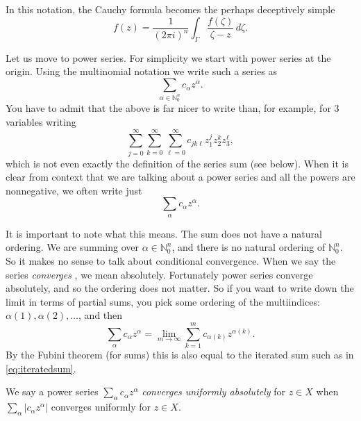 \documentclass[12pt,openany]{book}
\newcommand{\sabs}[1]{\lvert {#1} \rvert}
\newcommand{\N}{{\mathbb{N}}}
\newcommand{\myindex}[1]{#1\index{#1}}
\theoremstyle{plain}
\theoremstyle{remark}
\theoremstyle{definition}
\theoremstyle{exercise}
\theoremstyle{example}
\begin{document}
In this notation, the Cauchy formula becomes the perhaps deceptively simple
\begin{equation*}
f(z) =
\frac{1}{{(2\pi i)}^n}
\int_{\Gamma}
\frac{f(\zeta)}{\zeta-z}
\,
d \zeta .
\end{equation*}

Let us move to power series.  For simplicity we start with
power series at the origin.  Using the multinomial notation we write
such a series as
\begin{equation*}
\sum_{\alpha \in \N_0^n} c_\alpha {z}^\alpha .
\end{equation*}
You have to admit that the
above is far nicer to write than, for example, for 3 variables writing
\begin{equation} \label{eq:iteratedsum}
\sum_{j=0}^\infty
\sum_{k=0}^\infty
\sum_{\ell=0}^\infty
c_{jk\ell} z_1^jz_2^kz_3^\ell ,
\end{equation}
which is not even exactly the definition of the series sum (see
below).
When it is clear
from context that we are talking about a power series
and all the powers are nonnegative,
we often write just
%
\begin{equation*}
\sum_{\alpha} c_\alpha {z}^\alpha .
\end{equation*}

It is important to note what this means.  The sum does not
have a natural ordering.  We are summing over $\alpha \in \N_0^n$, and there
is no natural ordering of $\N_0^n$.  So it makes no sense to
talk about conditional convergence.  When we say the series
\emph{converges}%
%
, we mean absolutely.
Fortunately power series converge
absolutely, and so the ordering does not matter.  So if you want to write
down the limit in terms of partial sums, you pick some ordering of the
multiindices: $\alpha(1), \alpha(2), \ldots$, and then
\begin{equation*}
\sum_{\alpha}
c_\alpha {z}^\alpha 
=
\lim_{m \to \infty}
\sum_{k=1}^m 
c_{\alpha(k)} {z}^{\alpha(k)} .
\end{equation*}
By the Fubini theorem (for sums) this is also equal to the iterated
sum such as in \eqref{eq:iteratedsum}.

We say a power series $\sum_\alpha c_\alpha z^\alpha$
\emph{\myindex{converges uniformly absolutely}}
for $z \in X$ when $\sum_\alpha \sabs{c_\alpha z^\alpha}$
converges uniformly for $z \in X$.
\end{document}
